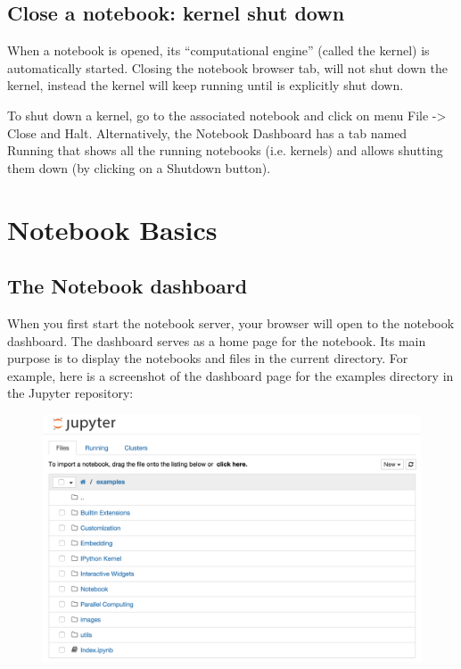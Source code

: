 \subsection{Close a notebook: kernel shut down}
When a notebook is opened, its “computational engine” (called the kernel) is automatically started. Closing the notebook browser tab, will not shut down the kernel, instead the kernel will keep running until is explicitly shut down.

To shut down a kernel, go to the associated notebook and click on menu File -> Close and Halt. Alternatively, the Notebook Dashboard has a tab named Running that shows all the running notebooks (i.e. kernels) and allows shutting them down (by clicking on a Shutdown button).

\section{Notebook Basics}
\subsection{The Notebook dashboard}
When you first start the notebook server, your browser will open to the notebook dashboard. The dashboard serves as a home page for the notebook. Its main purpose is to display the notebooks and files in the current directory. For example, here is a screenshot of the dashboard page for the examples directory in the Jupyter repository:

\begin{figure}
    \centering
    \includegraphics[width=\linewidth]{dashboard_files_tab.png}
\end{figure}

